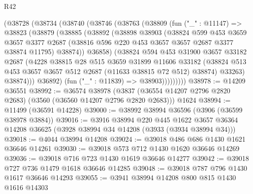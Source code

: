 \begin{lexlean}{R42}
\begin{coremodule}
        (@38728
          (@38734
            (@38740
              (@38746
                (@38763
                  (@38809
                    (fun ("_" : @11147) =>
                    @38823
                      (@38879
                        (@38885
                          (@38892
                            (@38898
                              @38903
                              (@38824
                                @599
                                @453
                                @3659
                                @3657
                                @3377
                                @2687
                                (@38816 @596 @220 @453 @3657 @3657 @2687 @3377 @38874 @11795)
                                @38874))
                            @36858)
                          (@38824
                            @594
                            @453
                            @31900
                            @3657
                            @33182
                            @2687
                            (@4228
                              @38815
                              @28
                              @515
                              @3659
                              @31899
                              @11606
                              @33182
                              (@38824
                                @513
                                @453
                                @3657
                                @3657
                                @512
                                @2687
                                (@11633 @38815 @72 @512)
                                @38874)
                              @33263)
                            @38874)))
                      @36892)
                    (fun ("_" : @11839) => @38903)))))))))
@38978 := @14209 @36551
@38992 := @36574
    @38978
    (@3837 (@36554 @14207 @2796 @2820 @2683) (@3560 (@36560 @14207 @2796 @2820 @2683)))
    @1624
@38994 := @11499 (@36591 @14228)
@39000 := @38992 @38994 @36596 (@3906 (@36599 @38978 @3884))
@39016 := @3916
    @38994
    @220
    @445
    @1622
    @3657
    @36364
    @14208
    @36625
    (@3928 @38994 @34 @14208 (@3933 (@3934 @38994 @34)))
@39018 := @4044 @38994 @14208
@39024 := @39018 @486 @686 @1430 @1621 @36646 @14261
@39030 := @39018 @573 @712 @1430 @1620 @36646 @14269
@39036 := @39018 @716 @723 @1430 @1619 @36646 @14277
@39042 := @39018 @727 @736 @1479 @1618 @36646 @14285
@39048 := @39018 @787 @796 @1430 @1617 @36646 @14293
@39055 := @3941 @38994 @14208 @800 @815 @1430 @1616 @14303

\end{coremodule}
\end{lexlean}
